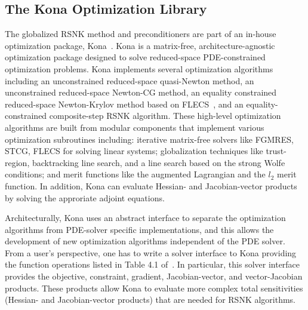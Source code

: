 \subsection{The Kona Optimization Library}\label{sec:kona_mv}
The globalized RSNK method and preconditioners are part of 
an in-house optimization package, Kona~\cite{dener:scitech2016}. Kona is a matrix-free, 
architecture-agnostic optimization package designed to solve reduced-space PDE-constrained 
optimization problems.  Kona implements several optimization 
algorithms including an unconstrained 
reduced-space quasi-Newton method, an unconstrained reduced-space 
Newton-CG method, an equality constrained reduced-space Newton-Krylov method 
based on FLECS~\cite{hicken:flecs2014}, and an equality-constrained composite-step RSNK algorithm.
These high-level optimization algorithms are built from modular components that implement various optimization subroutines including:
iterative matrix-free solvers like FGMRES, STCG, FLECS for solving linear systems; 
globalization techniques like trust-region, backtracking line search, and a line search based on 
the strong Wolfe conditions;   and merit functions like the augmented Lagrangian and the $l_2$ 
merit function.  In addition, Kona can evaluate Hessian- and Jacobian-vector products by solving the approriate adjoint equations. 

Architecturally, Kona uses an abstract interface to separate the optimization algorithms from PDE-solver specific implementations, and this allows the development of new optimization algorithms independent of the PDE solver. 
 From a user's perspective, one has to write a solver interface to Kona providing 
the function operations listed in Table 4.1 of~\cite{dener_thesis_2017}. In particular, this solver interface 
provides the objective, constraint, gradient, Jacobian-vector, and vector-Jacobian products.
These products allow Kona to evaluate more complex total sensitivities (\eg Hessian- and Jacobian-vector products)
that are needed for RSNK algorithms.





